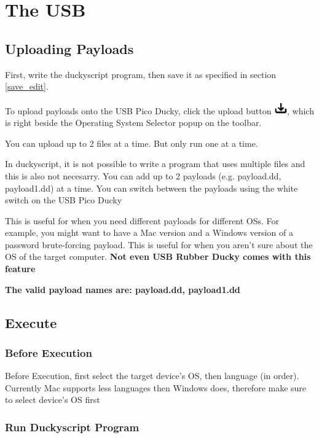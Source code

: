 \documentclass[a4paper,12pt]{article}
\begin{document}
\section{The USB}

\subsection{Uploading Payloads}\label{upload_payloads}

First, write the duckyscript program, then save it as specified in section \ref{save_edit}.

To upload payloads onto the USB Pico Ducky, click the upload button \includegraphics[width=5.5mm]{pictures/white_bk/upload.png}, which is right beside the Operating System Selector popup on the toolbar.

You can upload up to 2 files at a time. But only run one at a time.

In duckyscript, it is not possible to write a program that uses multiple files and this is also not necesarry. You can add up to 2 payloads (e.g. payload.dd, payload1.dd) at a time. You can switch between the payloads using the white switch on the USB Pico Ducky

This is useful for when you need different payloads for different OSs. For example, you might want to have a Mac version and a Windows version of a password brute-forcing payload. This is useful for when you aren't sure about the OS of the target computer. \textbf{Not even USB Rubber Ducky comes with this feature}

\textbf{The valid payload names are: payload.dd, payload1.dd}

\subsection{Execute}

\subsubsection{Before Execution}

Before Execution, first select the target device's OS, then language (in order). Currently Mac supports less languages then Windows does, therefore make sure to select device's OS first

\subsubsection{Run Duckyscript Program}
\end{document}
